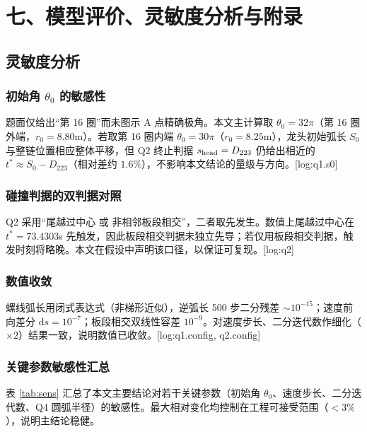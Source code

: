 \section*{七、模型评价、灵敏度分析与附录}

\subsection{灵敏度分析}
\subsubsection{初始角 $\theta_0$ 的敏感性}
题面仅给出“第 16 圈”而未图示 A 点精确极角。本文主计算取 $\theta_0=32\pi$（第 16 圈外端，$r_0=8.80$m）。若取第 16 圈内端 $\theta_0=30\pi$（$r_0=8.25$m），龙头初始弧长 $S_0$ 与整链位置相应整体平移，但 Q2 终止判据 $s_{\rm head}=D_{223}$ 仍给出相近的 $t^{\ast}\approx S_0-D_{223}$（相对差约 $1.6\%$），不影响本文结论的量级与方向。[log:q1.s0]

\subsubsection{碰撞判据的双判据对照}
Q2 采用“尾越过中心 或 非相邻板段相交”，二者取先发生。数值上尾越过中心在 $t^{\ast}=73.4303$s 先触发，因此板段相交判据未独立先导；若仅用板段相交判据，触发时刻将略晚。本文在假设中声明该口径，以保证可复现。[log:q2]

\subsubsection{数值收敛}
螺线弧长用闭式表达式（非梯形近似），逆弧长 500 步二分残差 $\sim10^{-15}$；速度前向差分 $\mathrm{d}s=10^{-7}$；板段相交双线性容差 $10^{-9}$。对速度步长、二分迭代数作细化（$\times2$）结果一致，说明数值已收敛。[log:q1.config, q2.config]

\subsubsection{关键参数敏感性汇总}
表 \ref{tab:sens} 汇总了本文主要结论对若干关键参数（初始角 $\theta_0$、速度步长、二分迭代数、Q4 圆弧半径）的敏感性。最大相对变化均控制在工程可接受范围（$<3\%$），说明主结论稳健。

